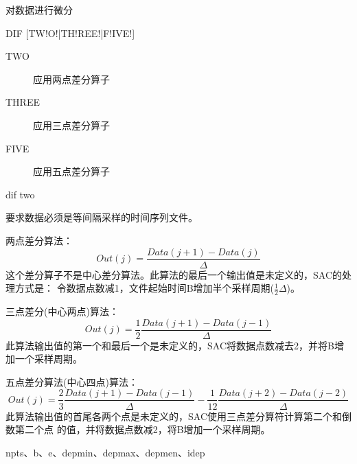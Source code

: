 \label{cmd:dif}

对数据进行微分

\begin{SACSTX}
DIF [TW!O!|TH!REE!|F!IVE!]
\end{SACSTX}

\begin{description}
\item [TWO]   应用两点差分算子
\item [THREE] 应用三点差分算子
\item [FIVE]  应用五点差分算子
\end{description}

\begin{SACDFT}
dif two
\end{SACDFT}

要求数据必须是等间隔采样的时间序列文件。

两点差分算法：
\[ Out(j) =\frac{Data(j+1) - Data(j)}{\Delta} \]
这个差分算子不是中心差分算法。此算法的最后一个输出值是未定义的，SAC的处理方式是：
令数据点数减1，文件起始时间B增加半个采样周期($\frac{1}{2}\Delta$)。

三点差分(中心两点)算法：
\[ Out(j) = \frac{1}{2} \frac{Data(j+1) - Data(j-1)}{\Delta} \]
此算法输出值的第一个和最后一个是未定义的，SAC将数据点数减去2，并将B增加一个采样周期。

五点差分算法(中心四点)算法：
\[ Out(j) = \frac{2}{3} \frac{Data(j+1) - Data(j-1)}{\Delta} - \frac{1}{12} \frac{Data(j+2) - Data(j-2)}{\Delta} \]
此算法输出值的首尾各两个点是未定义的，SAC使用三点差分算符计算第二个和倒数第二个点
的值，并将数据点数减2，将B增加一个采样周期。

npts、b、e、depmin、depmax、depmen、idep

